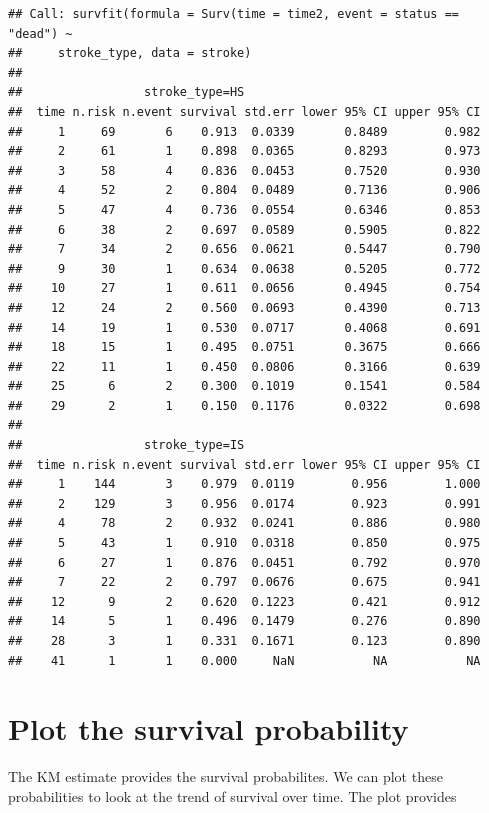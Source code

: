 \documentclass[
  10pt,
]{krantz}
\begin{document}
\begin{verbatim}
## Call: survfit(formula = Surv(time = time2, event = status == "dead") ~ 
##     stroke_type, data = stroke)
## 
##                 stroke_type=HS 
##  time n.risk n.event survival std.err lower 95% CI upper 95% CI
##     1     69       6    0.913  0.0339       0.8489        0.982
##     2     61       1    0.898  0.0365       0.8293        0.973
##     3     58       4    0.836  0.0453       0.7520        0.930
##     4     52       2    0.804  0.0489       0.7136        0.906
##     5     47       4    0.736  0.0554       0.6346        0.853
##     6     38       2    0.697  0.0589       0.5905        0.822
##     7     34       2    0.656  0.0621       0.5447        0.790
##     9     30       1    0.634  0.0638       0.5205        0.772
##    10     27       1    0.611  0.0656       0.4945        0.754
##    12     24       2    0.560  0.0693       0.4390        0.713
##    14     19       1    0.530  0.0717       0.4068        0.691
##    18     15       1    0.495  0.0751       0.3675        0.666
##    22     11       1    0.450  0.0806       0.3166        0.639
##    25      6       2    0.300  0.1019       0.1541        0.584
##    29      2       1    0.150  0.1176       0.0322        0.698
## 
##                 stroke_type=IS 
##  time n.risk n.event survival std.err lower 95% CI upper 95% CI
##     1    144       3    0.979  0.0119        0.956        1.000
##     2    129       3    0.956  0.0174        0.923        0.991
##     4     78       2    0.932  0.0241        0.886        0.980
##     5     43       1    0.910  0.0318        0.850        0.975
##     6     27       1    0.876  0.0451        0.792        0.970
##     7     22       2    0.797  0.0676        0.675        0.941
##    12      9       2    0.620  0.1223        0.421        0.912
##    14      5       1    0.496  0.1479        0.276        0.890
##    28      3       1    0.331  0.1671        0.123        0.890
##    41      1       1    0.000     NaN           NA           NA
\end{verbatim}

\hypertarget{plot-the-survival-probability}{%
\section{\texorpdfstring{Plot the survival probability}{Plot the survival probability}}\label{plot-the-survival-probability}}

The KM estimate provides the survival probabilites. We can plot these probabilities to look at the trend of survival over time. The plot provides
\end{document}
